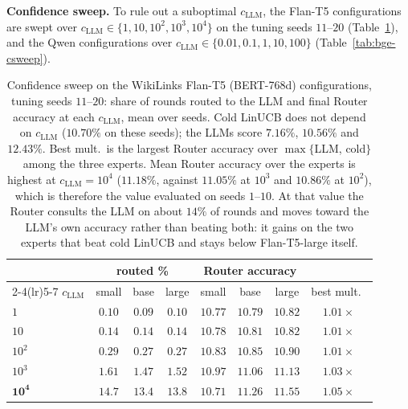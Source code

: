 \documentclass[anon]{alt2027} %
\begin{document}
\textbf{Confidence sweep.} To rule out a suboptimal $c_{\mathrm{LLM}}$, the Flan-T5
configurations are swept over $c_{\mathrm{LLM}}\in\{1,10,10^2,10^3,10^4\}$ on the tuning seeds
$11$--$20$ (Table~\ref{tab:wiki-csweep}), and the Qwen configurations over
$c_{\mathrm{LLM}}\in\{0.01,0.1,1,10,100\}$ (Table~\ref{tab:bge-csweep}).

\begin{table}[h]
\centering
\caption{Confidence sweep on the WikiLinks Flan-T5 (BERT-768d) configurations,
tuning seeds $11$--$20$: share of rounds routed to the LLM and final Router
accuracy at each $c_{\mathrm{LLM}}$, mean over seeds. Cold LinUCB does not depend on $c_{\mathrm{LLM}}$
($10.70\%$ on these seeds); the LLMs score $7.16\%$, $10.56\%$ and $12.43\%$.
Best mult.\ is the largest Router accuracy over $\max\{$LLM, cold$\}$ among the
three experts. Mean Router accuracy over the experts is highest at
$c_{\mathrm{LLM}}=10^4$ ($11.18\%$, against $11.05\%$ at $10^3$ and $10.86\%$ at $10^2$),
which is therefore the value evaluated on seeds $1$--$10$. At that value the
Router consults the LLM on about $14\%$ of rounds and moves toward the LLM's
own accuracy rather than beating both: it gains on the two experts that beat
cold LinUCB and stays below Flan-T5-large itself.}
\label{tab:wiki-csweep}
\scriptsize
\setlength{\tabcolsep}{4pt}
\begin{tabular}{@{}lccccccc@{}}
\toprule
& \multicolumn{3}{c}{routed \%} & \multicolumn{3}{c}{Router accuracy} & \\
\cmidrule(lr){2-4}\cmidrule(lr){5-7}
$c_{\mathrm{LLM}}$ & small & base & large & small & base & large & best mult.\ \\
\midrule
$1$ & $0.10$ & $0.09$ & $0.10$ & $10.77$ & $10.79$ & $10.82$ & $1.01\times$ \\
$10$ & $0.14$ & $0.14$ & $0.14$ & $10.78$ & $10.81$ & $10.82$ & $1.01\times$ \\
$10^2$ & $0.29$ & $0.27$ & $0.27$ & $10.83$ & $10.85$ & $10.90$ & $1.01\times$ \\
$10^3$ & $1.61$ & $1.47$ & $1.52$ & $10.97$ & $11.06$ & $11.13$ & $1.03\times$ \\
$\mathbf{10^4}$ & $14.7$ & $13.4$ & $13.8$ & $10.71$ & $11.26$ & $\mathbf{11.55}$ & $\mathbf{1.05\times}$ \\
\bottomrule
\end{tabular}
\end{table}
\end{document}
